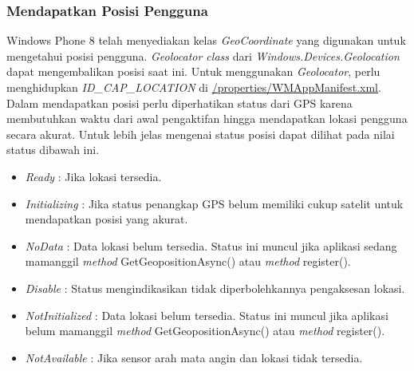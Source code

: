 \subsubsection{Mendapatkan Posisi Pengguna}
\label{subsubsec:Mendapatkan Posisi Pengguna}
\hspace{0.5cm} Windows Phone 8 telah menyediakan kelas \textit{GeoCoordinate} yang digunakan untuk mengetahui posisi pengguna. \textit{Geolocator class} dari \textit{Windows.Devices.Geolocation} dapat mengembalikan posisi saat ini. Untuk menggunakan \textit{Geolocator}, perlu menghidupkan \textit{ID\_CAP\_LOCATION} di \url{/properties/WMAppManifest.xml}. Dalam mendapatkan posisi perlu diperhatikan status dari GPS karena membutuhkan waktu dari awal pengaktifan hingga mendapatkan lokasi pengguna secara akurat. Untuk lebih jelas mengenai status posisi dapat dilihat pada nilai status dibawah ini.

\begin{itemize}
	\item \textit{Ready} : Jika lokasi tersedia.
	\item \textit{Initializing} : Jika status penangkap GPS belum memiliki cukup satelit untuk mendapatkan posisi yang akurat. 
	\item \textit{NoData} : Data lokasi belum tersedia. Status ini muncul jika aplikasi sedang mamanggil \textit{method} GetGeopositionAsync() atau \textit{method} register().
	\item \textit{Disable} : Status mengindikasikan tidak diperbolehkannya pengaksesan lokasi.
	\item \textit{NotInitialized} : Data lokasi belum tersedia. Status ini muncul jika aplikasi belum mamanggil \textit{method} GetGeopositionAsync() atau \textit{method} register().
	\item \textit{NotAvailable} : Jika sensor arah mata angin dan lokasi tidak tersedia.
\end{itemize}

